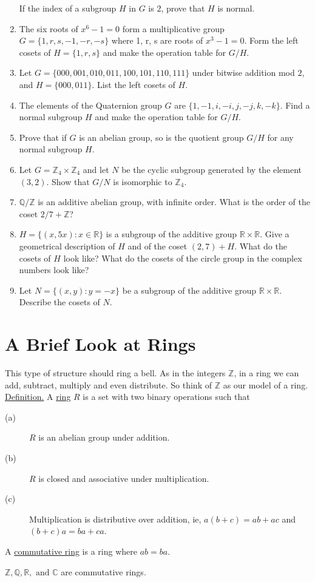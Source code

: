 \documentclass[12pt]{book}
\theoremstyle{definition}
\def\Z{\mathbb{Z}}
\begin{document}
\begin{enumerate}
	If the index of a subgroup $H$ in $G$ is $2$, prove that $H$ is normal.
	\item
	The six roots of $x^6-1 = 0$ form a multiplicative group $G = \{ 1,r,s,-1,-r,-s\}$ where 1, r, s are roots of $x^3-1=0$. Form the left cosets of $H =\{1,r,s\}$ and make the operation table for $G/H$.
	\item
	Let $G = \{000,001,010,011,100,101,110,111\}$ under bitwise addition mod $2$, and $H= \{000,011\}$. List the left cosets of $H$.
	\item
	The elements of the Quaternion group $G$ are $\{1,-1,i,-i,j,-j,k,-k\}$. Find a normal subgroup $H$ and make the operation table for $G/H$.
	\item
	Prove that if $G$ is an abelian group, so is the quotient group $G/H$ for any normal subgroup $H$.
	\item
	Let $G=\Z_4\times \Z_4$ and let $N$ be the cyclic subgroup generated by the element $(3,2)$. Show that $G/N$ is isomorphic to $\Z_4$.
	\item
	$\mathbb{Q}/\Z$ is an additive abelian group, with infinite order. What is the order of the coset $2/7 + \Z$?
	\item
	$H = \{(x,5x): x\in \mathbb{R}\}$ is a subgroup of the additive group $\mathbb{R}\times \mathbb{R}$. Give a geometrical description of $H$ and of the coset $(2,7) + H$. What do the cosets of $H$ look like? What do the cosets of the circle group in the complex numbers look like?
	\item
	Let $N = \{(x,y):y = -x\}$ be a subgroup of the additive group $\mathbb{R}\times \mathbb{R}$. Describe the cosets of $N$.
\end{enumerate}
\section{A Brief Look at Rings}

This type of structure should ring a bell.  As in the integers $\Z$, in a ring we can add, subtract, multiply and even distribute.  So think of $\Z$ as our model of a ring.\\
\underline{Definition.} A \underline{ring} $R$  is a set with two binary operations such that
\begin{description}
\item[\quad(a)]$R$ is an abelian group under addition.
\item[\quad(b)]$R$ is closed and associative under multiplication.
\item[\quad(c)]Multiplication is distributive over addition, ie, $a(b+c)=ab+ac$ and $(b+c)a=ba+ca$.
\end{description}
A \underline{commutative ring} is a ring where $ab=ba$.\\
\begin{tcexample}{}{}
 $\Z,\mathbb{Q},\mathbb{R}, \text{ and } \mathbb{C}$ are commutative rings.
\end{tcexample}
\end{document}
